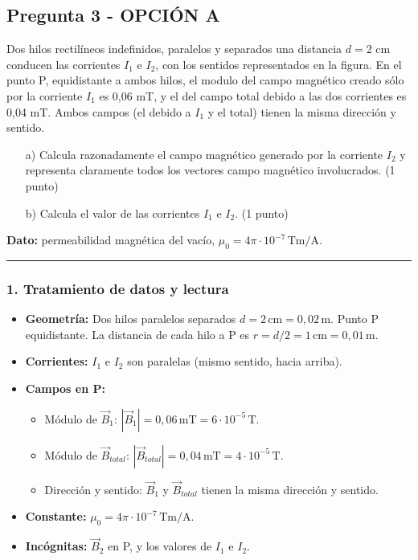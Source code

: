 \subsection{Pregunta 3 - OPCIÓN A}
\label{subsec:3A_2019_jul_ext}

\begin{cajaenunciado}
Dos hilos rectilíneos indefinidos, paralelos y separados una distancia $d=2$ cm conducen las corrientes $I_1$ e $I_2$, con los sentidos representados en la figura. En el punto P, equidistante a ambos hilos, el modulo del campo magnético creado sólo por la corriente $I_1$ es 0,06 mT, y el del campo total debido a las dos corrientes es 0,04 mT. Ambos campos (el debido a $I_1$ y el total) tienen la misma dirección y sentido.
\begin{enumerate}
    \item[a)] Calcula razonadamente el campo magnético generado por la corriente $I_2$ y representa claramente todos los vectores campo magnético involucrados. (1 punto)
    \item[b)] Calcula el valor de las corrientes $I_1$ e $I_2$. (1 punto)
\end{enumerate}
\textbf{Dato:} permeabilidad magnética del vacío, $\mu_0=4\pi\cdot10^{-7}\,\text{T}\text{m/A}$.
\end{cajaenunciado}
\hrule

\subsubsection*{1. Tratamiento de datos y lectura}
\begin{itemize}
    \item \textbf{Geometría:} Dos hilos paralelos separados $d=2\,\text{cm}=0,02\,\text{m}$. Punto P equidistante. La distancia de cada hilo a P es $r=d/2=1\,\text{cm}=0,01\,\text{m}$.
    \item \textbf{Corrientes:} $I_1$ e $I_2$ son paralelas (mismo sentido, hacia arriba).
    \item \textbf{Campos en P:}
    \begin{itemize}
        \item Módulo de $\vec{B}_1$: $|\vec{B}_1| = 0,06\,\text{mT} = 6\cdot10^{-5}\,\text{T}$.
        \item Módulo de $\vec{B}_{total}$: $|\vec{B}_{total}| = 0,04\,\text{mT} = 4\cdot10^{-5}\,\text{T}$.
        \item Dirección y sentido: $\vec{B}_1$ y $\vec{B}_{total}$ tienen la misma dirección y sentido.
    \end{itemize}
    \item \textbf{Constante:} $\mu_0 = 4\pi\cdot10^{-7}\,\text{T}\text{m/A}$.
    \item \textbf{Incógnitas:} $\vec{B}_2$ en P, y los valores de $I_1$ e $I_2$.
\end{itemize}

